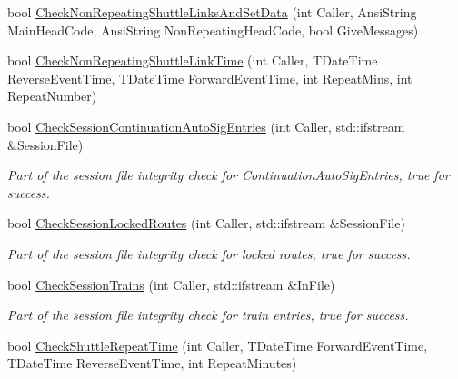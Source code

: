 \begin{DoxyCompactItemize}
bool \mbox{\hyperlink{class_t_train_controller_aa991976bc8ea956f9e9230f6a6921ac1}{Check\+Non\+Repeating\+Shuttle\+Links\+And\+Set\+Data}} (int Caller, Ansi\+String Main\+Head\+Code, Ansi\+String Non\+Repeating\+Head\+Code, bool Give\+Messages)
\item 
bool \mbox{\hyperlink{class_t_train_controller_a45168500acc985a1573602e0c00a0d9a}{Check\+Non\+Repeating\+Shuttle\+Link\+Time}} (int Caller, T\+Date\+Time Reverse\+Event\+Time, T\+Date\+Time Forward\+Event\+Time, int Repeat\+Mins, int Repeat\+Number)
\item 
\mbox{\label{class_t_train_controller_a96985493678231bbcad15b36c0c63579}} 
bool \mbox{\hyperlink{class_t_train_controller_a96985493678231bbcad15b36c0c63579}{Check\+Session\+Continuation\+Auto\+Sig\+Entries}} (int Caller, std\+::ifstream \&Session\+File)
\begin{DoxyCompactList}\small\item\em Part of the session file integrity check for Continuation\+Auto\+Sig\+Entries, true for success. \end{DoxyCompactList}\item 
\mbox{\label{class_t_train_controller_a4d5ebc5a4b6dda080840913822f3f238}} 
bool \mbox{\hyperlink{class_t_train_controller_a4d5ebc5a4b6dda080840913822f3f238}{Check\+Session\+Locked\+Routes}} (int Caller, std\+::ifstream \&Session\+File)
\begin{DoxyCompactList}\small\item\em Part of the session file integrity check for locked routes, true for success. \end{DoxyCompactList}\item 
\mbox{\label{class_t_train_controller_a53fb58a1ae6103601a24ad2162f86f58}} 
bool \mbox{\hyperlink{class_t_train_controller_a53fb58a1ae6103601a24ad2162f86f58}{Check\+Session\+Trains}} (int Caller, std\+::ifstream \&In\+File)
\begin{DoxyCompactList}\small\item\em Part of the session file integrity check for train entries, true for success. \end{DoxyCompactList}\item 
\mbox{\label{class_t_train_controller_afe4a83b3b7ba6daa955ce5617d509d51}} 
bool \mbox{\hyperlink{class_t_train_controller_afe4a83b3b7ba6daa955ce5617d509d51}{Check\+Shuttle\+Repeat\+Time}} (int Caller, T\+Date\+Time Forward\+Event\+Time, T\+Date\+Time Reverse\+Event\+Time, int Repeat\+Minutes)

\end{DoxyCompactItemize}
